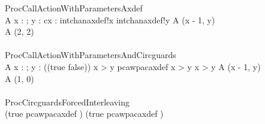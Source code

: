 \begin{circus}
 \circprocess ProcCallActionWithParametersAxdef \circdef \circbegin \\
    A \circdef x : \nat ; y : \nat \circspot \circvar cx : \nat \circspot intchanaxdef!x \then intchanaxdef!y \then A (x - 1, y) \\
    \circspot A (2, 2) \\
 \circend \\
 
 \circprocess ProcCallActionWithParametersAndCircguards \circdef \circbegin \\
    A \circdef x : \nat ; y : \nat \circspot \lcircguard (\lnot (true \lor false)) \land x > y  \rcircguard \circguard pcawpacaxdef \then \lcircguard x > y \land x > y \rcircguard \circguard A (x - 1, y) \\
    \circspot A (1, 0) \\
 \circend \\

 \circprocess ProcCircguardsForcedInterleaving \circdef \circbegin \\
    \circspot 
      (\lcircguard true \rcircguard \circguard pcawpacaxdef \then \Skip)
      \interleave
      (\lcircguard true \rcircguard \circguard pcawpacaxdef \then \Skip)
      \\
 \circend \\

\end{circus}
